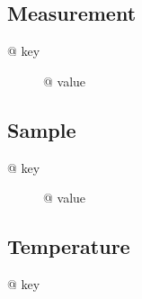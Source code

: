 \subsection{Measurement}

\begin{description}
\item[{@ key }] {@ value }
\end{description}

\subsection{Sample}

\begin{description}
\item[{@ key }] {@ value }
\end{description}

\subsection{Temperature}

\begin{description}
\item[{@ key }] %

\end{description}
